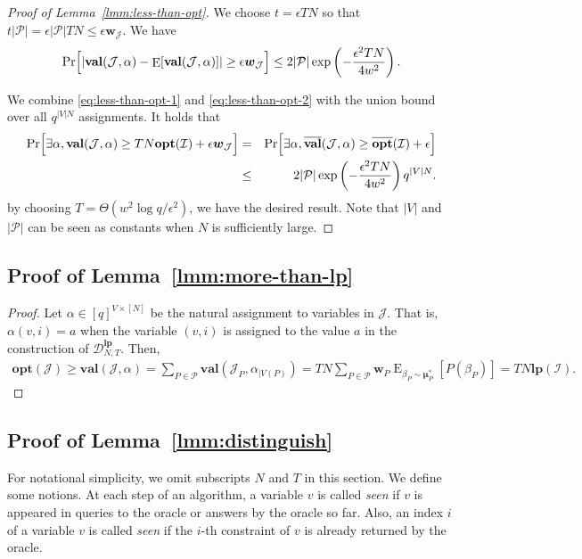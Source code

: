 \documentclass[letterpaper, 11pt]{article}
\newcommand{\calD}{\mathcal{D}}
\newcommand{\calI}{\mathcal{I}}
\newcommand{\calJ}{\mathcal{J}}
\newcommand{\calP}{\mathcal{P}}
\newcommand{\biw}{\boldsymbol{w}}
\newcommand{\bimu}{\boldsymbol{\mu}}
\newcommand{\lp}{\mathbf{lp}}
\newcommand{\opt}{\mathbf{opt}}
\newcommand{\val}{\mathbf{val}}
\newcommand{\olopt}{\overline{\mathbf{opt}}}
\newcommand{\olval}{\overline{\mathbf{val}}}
\newcommand{\E}{\mathop{\mathrm{E}}}
\begin{document}
\begin{proof}[Proof of Lemma~\ref{lmm:less-than-opt}]
  We choose $t = \epsilon TN$ so that $t|\calP| = \epsilon |\calP|TN \leq \epsilon \biw_{\calJ}$.
  We have
  \begin{eqnarray}
    \Pr\Bigl[|\val(\calJ,\alpha)-\E[\val(\calJ,\alpha)]|\geq \epsilon \biw_{\calJ}  \Bigr]
    \leq
    2|\calP|\exp\left(-\frac{\epsilon^2 TN}{4w^2}\right). \label{eq:less-than-opt-2}
  \end{eqnarray}
  
  We combine \eqref{eq:less-than-opt-1} and \eqref{eq:less-than-opt-2} with the union bound over all $q^{|V|N}$ assignments.
  It holds that
  \begin{eqnarray*}
    \Pr\Bigl[\exists \alpha, \val(\calJ,\alpha) \geq TN\opt(\calI) + \epsilon \biw_{\calJ} \Bigr] 
    &=&
    \Pr\Bigl[\exists \alpha, \olval(\calJ,\alpha) \geq \olopt(\calI) + \epsilon \Bigr]\\
    &\leq&
    2|\calP|\exp\left(-\frac{\epsilon^2 TN}{4w^2}\right) q^{|V|N}.
  \end{eqnarray*}
  by choosing $T=\Theta(w^2\log q/\epsilon^2)$, we have the desired result.
  Note that $|V|$ and $|\calP|$ can be seen as constants when $N$ is sufficiently large.
\end{proof}

\subsection{Proof of Lemma~\ref{lmm:more-than-lp}}\label{sec:more-than-lp}
\begin{proof}
  Let $\alpha \in [q]^{V\times [N]}$ be the natural assignment to variables in $\calJ$.
  That is, $\alpha(v,i)=a$ when the variable $(v,i)$ is assigned to the value $a$ in the construction of $\calD_{N,T}^{\lp}$.
  Then,
  \begin{eqnarray*}
    \opt(\calJ) 
    \geq
    \val(\calJ,\alpha)
    =
    \sum_{P\in \calP}\val(\calJ_P,\alpha_{|V(P)}) 
    =
    TN\sum_{P\in \calP} \biw_P \E_{\beta_P \sim \bimu^*_P}[P(\beta_P)]
    =
    TN\lp(\calI).
  \end{eqnarray*}
\end{proof}

\subsection{Proof of Lemma~\ref{lmm:distinguish}}\label{sec:distinguish}
For notational simplicity, we omit subscripts $N$ and $T$ in this section.
We define some notions.
At each step of an algorithm,
a variable $v$ is called \textit{seen} if $v$ is appeared in queries to the oracle or answers by the oracle so far. 
Also, an index $i$ of a variable $v$ is called \textit{seen} if the $i$-th constraint of $v$ is already returned by the oracle.
\end{document}
